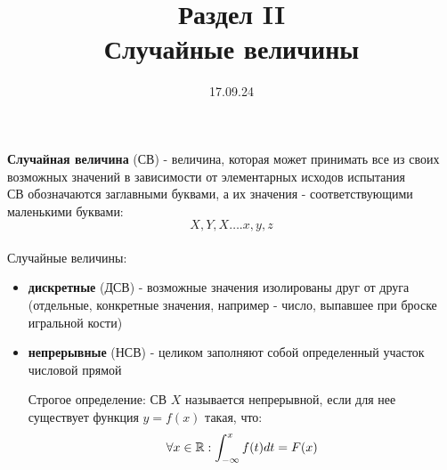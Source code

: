 

\title{Раздел II \\
       Случайные величины}
\date{17.09.24}


    \maketitle
    \begin{opr}
        \textbf{Случайная величина} (СВ) - величина, которая может принимать
        все из своих возможных значений в зависимости от элементарных
        исходов испытания
        \\
        СВ обозначаются заглавными буквами, 
        а их значения - соответствующими маленькими буквами:
        \begin{equation}
            X, Y, X \dots . x, y, z
        \end{equation}
        \\
        Случайные величины: 
        \begin{itemize}
            \item \textbf{дискретные} (ДСВ) - возможные значения изолированы друг от друга 
                  (отдельные, конкретные значения, например - число, выпавшее при 
                  броске игральной кости)
            \item \textbf{непрерывные} (НСВ) - целиком заполняют собой определенный участок 
                  числовой прямой
                  \begin{opr} Строгое определение:
                    СВ \(X\) называется непрерывной, если для нее существует 
                    функция \(y = f(x)\) такая, что:
                    \begin{equation}
                        \forall x \in \mathbb{R}: \int_{-\infty}^{x} f(t)dt = F(x)
                    \end{equation}


\end{opr}
\end{itemize}
\end{opr}
